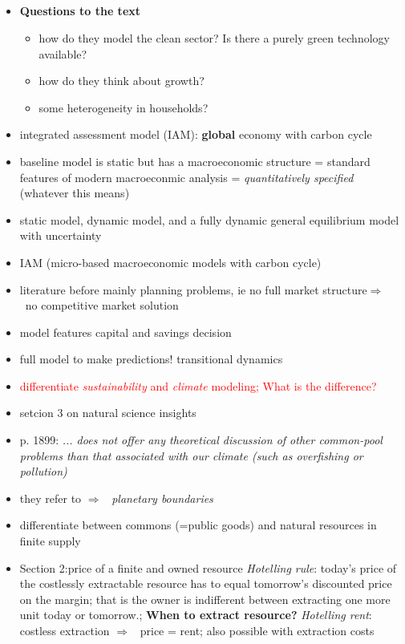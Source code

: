 \documentclass[12pt]{article}
\newcommand{\ar}{$\Rightarrow$ \ }
\newcommand{\tr}[1]{\textcolor{red}{#1}}
\begin{document}
  \subsection{\cite{Hassler2016EnvironmentalMacroeconomics}}
\begin{itemize}
	\item \textbf{Questions to the text}
	\begin{itemize}
\item how do they model the clean sector? Is there a purely green technology available? 
\item how do they think about growth?
\item some heterogeneity in households?
	\end{itemize}
	 \item integrated assessment model (IAM): \textbf{global} economy with carbon cycle 
	 \item baseline model is static but has a macroeconomic structure = standard features of modern macroeconmic analysis = \textit{quantitatively specified} (whatever this means)
	 \item static model, dynamic model, and a fully dynamic general equilibrium model with uncertainty
	 \item IAM (micro-based macroeconomic models with carbon cycle)
	 \item literature before mainly planning problems, ie no full market structure\ar no competitive market solution
	 \item model features capital and savings decision
	 \item full model to make predictions! transitional dynamics 
	 \item \tr{differentiate \textit{sustainability} and \textit{climate} modeling; What is the difference?}
	 	\item setcion 3 on natural science insights
	 	\item p. 1899: \textit{... does not offer any theoretical discussion of other common-pool problems than that associated with our climate (such as overfishing or pollution)}
	 	\item they refer to \cite{Rockstrom2009AHumanity}\ar \textit{planetary boundaries}
	 	\item differentiate between commons (=public goods) and natural resources in finite supply
	 	\item Section 2:price of a finite and owned resource \textit{Hotelling rule}: today's price of the costlessly extractable resource has to equal tomorrow's discounted price on the margin; that is the owner is indifferent between extracting one more unit today or tomorrow.; \textbf{When to extract resource?} \textit{Hotelling rent}: costless extraction \ar price = rent; also possible with extraction costs

\end{itemize}
\end{document}
